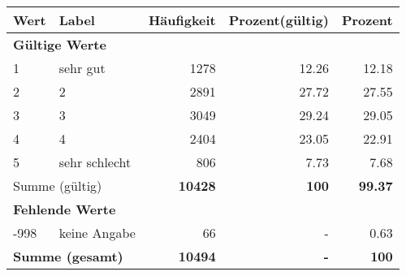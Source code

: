      \begin{longtable}{lXrrr}
     \toprule
     \textbf{Wert} & \textbf{Label} & \textbf{Häufigkeit} & \textbf{Prozent(gültig)} & \textbf{Prozent} \\
     \endhead
     \midrule
     \multicolumn{5}{l}{\textbf{Gültige Werte}}\\

     1 &
     \multicolumn{1}{X}{ sehr gut   } &


       \num{1278} &
       \num[round-mode=places,round-precision=2]{12,26} &
         \num[round-mode=places,round-precision=2]{12,18} \\

     2 &
     \multicolumn{1}{X}{ 2   } &


       \num{2891} &
       \num[round-mode=places,round-precision=2]{27,72} &
         \num[round-mode=places,round-precision=2]{27,55} \\

     3 &
     \multicolumn{1}{X}{ 3   } &


       \num{3049} &
       \num[round-mode=places,round-precision=2]{29,24} &
         \num[round-mode=places,round-precision=2]{29,05} \\

     4 &
     \multicolumn{1}{X}{ 4   } &


       \num{2404} &
       \num[round-mode=places,round-precision=2]{23,05} &
         \num[round-mode=places,round-precision=2]{22,91} \\

     5 &
     \multicolumn{1}{X}{ sehr schlecht   } &


       \num{806} &
       \num[round-mode=places,round-precision=2]{7,73} &
         \num[round-mode=places,round-precision=2]{7,68} \\
     \midrule
     \multicolumn{2}{l}{Summe (gültig)} &
       \textbf{\num{10428}} &
     \textbf{100} &
       \textbf{\num[round-mode=places,round-precision=2]{99,37}} \\
     \multicolumn{5}{l}{\textbf{Fehlende Werte}}\\
       -998 &
       keine Angabe &
         \num{66} &
        - &
         \num[round-mode=places,round-precision=2]{0,63} \\
     \midrule
     \multicolumn{2}{l}{\textbf{Summe (gesamt)}} &
          \textbf{\num{10494}} &
        \textbf{-} &
        \textbf{100} \\
     \bottomrule
     \end{longtable}
     
